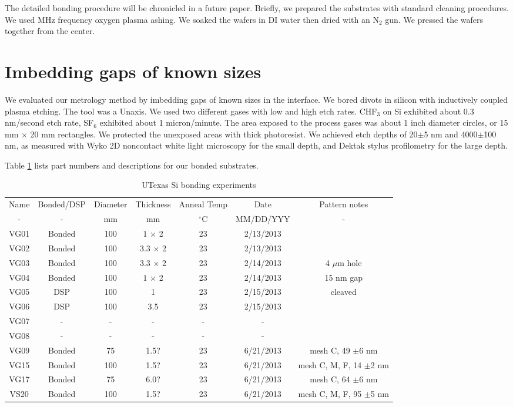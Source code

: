 \documentclass[osajnl,preprint,showpacs,superscriptaddress,12pt]{revtex4-1} %
\begin{document}
The detailed bonding procedure will be chronicled in a future paper.  Briefly, we prepared the substrates with standard cleaning procedures.  We used MHz frequency oxygen plasma ashing.  We soaked the wafers in DI water then dried with an N$_2$ gun.  We pressed the wafers together from the center.

\section{Imbedding gaps of known sizes}
We evaluated our metrology method by imbedding gaps of known sizes in the interface.  We bored divots in silicon with inductively coupled plasma etching.  The tool was a Unaxis.  We used two different gases with low and high etch rates.  CHF$_3$ on Si exhibited about 0.3 nm/second etch rate, SF$_6$ exhibited about 1 micron/minute.  The area exposed to the process gases was about 1 inch diameter circles, or 15 mm $\times$ 20 mm rectangles.  We protected the unexposed areas with thick photoresist.  We achieved etch depths of 20$\pm$5 nm and 4000$\pm$100 nm, as measured with Wyko 2D noncontact white light microscopy for the small depth, and Dektak stylus profilometry for the large depth.  

Table \ref{tab:bondexper} lists part numbers and descriptions for our bonded substrates.

\begin{table}[h!]
\caption{UTexas Si bonding experiments \label{tab:bondexper}}
\begin{center}
    \begin{tabular}{ c c c c c c c}
    \hline
    Name & Bonded/DSP & Diameter & Thickness & Anneal Temp & Date & Pattern notes \\ 
    - & - & mm & mm & $^\circ$C & MM/DD/YYY & - \\ 
        \hline
    VG01 & Bonded  & 100  &$1$ $\times$ 2 & 23  & 2/13/2013 &  \\
    VG02 & Bonded & 100 & $3.3$ $\times$ 2 &  23  & 2/13/2013 &  \\
    VG03 & Bonded & 100 & $3.3$ $\times$ 2 &  23 & 2/14/2013 & 4 $\mu$m hole \\    
    VG04 & Bonded & 100 & $1$ $\times$ 2 &  23 & 2/14/2013 & 15 nm gap \\        
    VG05 & DSP & 100 & 1&  23 & 2/15/2013 & cleaved  \\
    VG06 & DSP & 100 & 3.5 &  23 & 2/15/2013 & \\
    VG07 & - & - & - &  - & - & \\
    VG08 & - & - & - &  - & - & \\
    VG09 & Bonded & 75 & 1.5? & 23 & 6/21/2013 & mesh C, 49 $\pm$6 nm \\
    VG15 & Bonded & 100 & 1.5? &  23 & 6/21/2013 & mesh C, M, F, 14 $\pm$2 nm\\
    VG17 & Bonded & 75 & 6.0? &  23 & 6/21/2013 & mesh C, 64 $\pm$6 nm\\
    VS20 & Bonded & 100 & 1.5? &  23 & 6/21/2013 & mesh C, M, F, 95 $\pm$5 nm\\
    \hline
    \end{tabular}
\end{center}
\end{table}
\end{document}
